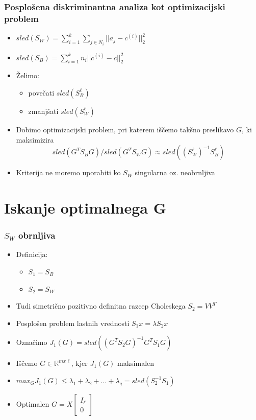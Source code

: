 \documentclass{beamer}
\begin{document}
\begin{frame}
\frametitle{Posplošena diskriminantna analiza kot optimizacijski problem}
\begin{itemize}
\item $ sled(S_W) = \sum_{i = 1}^{k} \sum_{j \in N_i} || a_j - c^{(i)}||_2^2$
\item $ sled(S_B) = \sum_{i = 1}^{k} n_i || c^{(i)} - c||_2^2$
\item Želimo:
\begin{itemize}
\item povečati $sled(S_B^\ell)$
\item zmanjšati $sled(S_W^\ell)$
\end{itemize}
\item Dobimo optimizacijski problem, pri katerem iščemo takšno preslikavo $G$, ki maksimizira
$$sled( G^T S_B G) / sled( G^T S_W G) \approx sled((S_W^\ell)^{-1}S_B^\ell)$$
\item Kriterija ne moremo uporabiti ko $S_W$ singularna oz. neobrnljiva
\end{itemize}
\end{frame}


\section{Iskanje optimalnega G}
\begin{frame}
\frametitle{$S_W$ obrnljiva} 
\begin{itemize}
\item Definicija:
\begin{itemize}
\item $S_1 = S_B$
\item $S_2 = S_W$
\end{itemize}
\item Tudi simetrično pozitivno definitna \textrightarrow razcep Choleskega $S_2 = VV^T$
\item Posplošen problem lastnih vrednosti $S_1 x = \lambda S_2 x$
\item Označimo $J_1(G) = sled((G^T S_2 G)^{-1}G^T S_1 G)$
\item Iščemo $G  \in \mathbb{R}^{ m x \ell }$, kjer $J_1(G)$ maksimalen
\item $max_G J_1(G) \leq \lambda_1 + \lambda_2 + \ldots +  \lambda_q = sled(S_2^{-1} S_1)$
\item Optimalen $G = X \begin{bmatrix} 
I_\ell \\
0 
\end{bmatrix}$
\end{itemize}
\end{frame}
\end{document}
